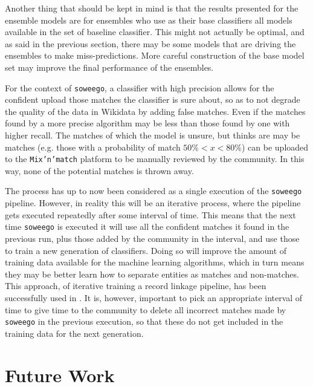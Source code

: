 \documentclass[epsfig,a4paper,11pt,titlepage,twoside,openany]{book}
\newcommand{\soweego}[0]{\texttt{soweego}\xspace}
\begin{document}
Another thing that should be kept in mind is that the results presented for the ensemble models are for ensembles who use as their base classifiers all models available in the set of baseline classifier. This might not actually be optimal, and as said in the previous section, there may be some models that are driving the ensembles to make miss-predictions. More careful construction of the base model set may improve the final performance of the ensembles. 

For the context of \soweego, a classifier with high precision allows for the confident upload those matches the classifier is sure about, so as to not degrade the quality of the data in Wikidata by adding false matches. Even if the matches found by a more precise algorithm may be less than those found by one with higher recall. The matches of which the model is unsure, but thinks are may be matches (e.g. those with a probability of match $50\% < x < 80\%$) can be uploaded to the \texttt{Mix'n'match} platform to be manually reviewed by the community. In this way, none of the potential matches is thrown away.

The process has up to now been considered as a single execution of the \soweego pipeline. However, in reality this will be an iterative process, where the pipeline gets executed repeatedly after some interval of time. This means that the next time \soweego is executed it will use all the confident matches it found in the previous run, plus those added by the community in the interval, and use those to train a new generation of classifiers. Doing so will improve the amount of training data available for the machine learning algorithms, which in turn means they may be better learn how to separate entities as matches and non-matches. This approach, of iterative training a record linkage pipeline, has been successfully used in \cite{Bhattacharya:2004_iterative}. It is, however, important to pick an appropriate interval of time to give time to the community to delete all incorrect matches made by \soweego in the previous execution, so that these do not get included in the training data for the next generation. 



\section{Future Work}
\label{sec:future-work}

\end{document}

